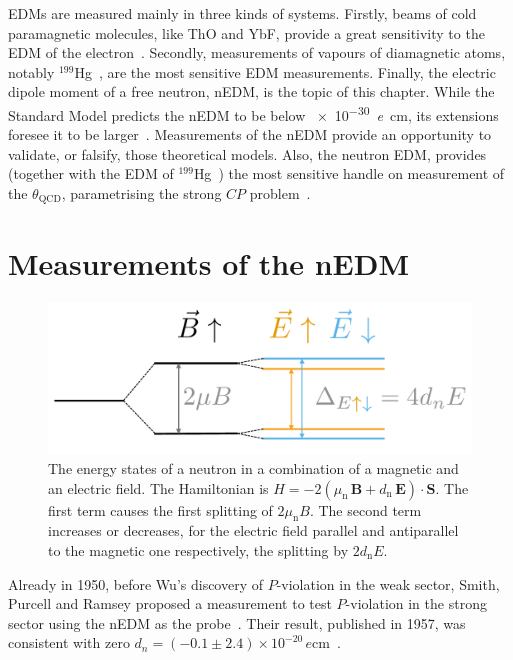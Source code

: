 EDMs are measured mainly in three kinds of systems.
Firstly, beams of cold paramagnetic molecules, like ThO and YbF, provide a great sensitivity to the EDM of the electron~\cite{ThO_eEDM,Hudson2011}.
Secondly, measurements of vapours of diamagnetic atoms, notably $^{199}$Hg~\cite{PhysRevLett.116.161601}, are the most sensitive EDM measurements.
Finally, the electric dipole moment of a free neutron, nEDM, is the topic of this chapter.
While the Standard Model predicts the nEDM to be below \SI{e-30}{\elementarycharge\centi\meter}, its extensions foresee it to be
larger~\cite{Ellis1989}. Measurements of the nEDM provide an opportunity to validate, or falsify, those theoretical models.
Also, the neutron EDM, provides (together with the EDM of ${}^{199}$Hg~\cite{PhysRevLett.116.161601}) the most sensitive handle on measurement of the $\theta_\text{QCD}$, parametrising the strong $CP$ problem~\cite{PDG2016}.



\section{Measurements of the nEDM}

\begin{figure}
  \centering
  \includegraphics[width=0.7\linewidth]{gfx/introduction/measurement_principle.pdf}
  \caption{The energy states of a neutron in a combination of a magnetic and an electric field. The Hamiltonian is $H = - 2 \left( \mu_\text{n} \, \mathbf{B} + d_\text{n} \, \mathbf{E} \right ) \cdot \mathbf{S}$. The first term causes the first splitting of $2\mu_\text{n} B$. The second term increases or decreases, for the electric field parallel and antiparallel to the magnetic one respectively, the splitting by $2 d_\text{n} E$.}\label{fig:nEDM_measurement_principle}
\end{figure}

Already in 1950, before Wu's discovery of $P$-violation in the weak sector, Smith, Purcell and Ramsey proposed a measurement to test $P$-violation in the strong sector using the nEDM as the probe~\cite{PhysRev.78.807}. Their result, published in 1957, was consistent with zero $d_n = (-0.1 \pm 2.4) \times 10^{-20}\,\si{\elementarycharge\centi\meter}$~\cite{PhysRev.108.120}.

